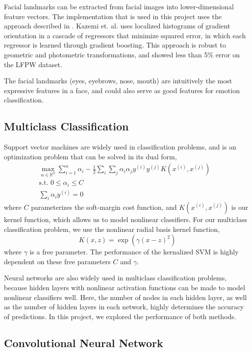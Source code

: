 \documentclass[10pt, twocolumn, twoside]{article}
\begin{document}
Facial landmarks can be extracted from facial images into lower-dimensional feature
vectors. The implementation that is used in this project uses the approach described
in \cite{Kazemi}. Kazemi et. al. uses localized histograms of gradient orientation in
a cascade of regressors that minimize squared error, in which each regressor is learned
through gradient boosting. This approach is robust to geometric and photometric
transformations, and showed less than 5\% error on the LFPW dataset.

The facial landmarks (eyes, eyebrows, nose, mouth) are intuitively the most expressive 
features in a face, and could also serve as good features for emotion classification.

\subsection{Multiclass Classification}

Support vector machines are widely used in classification problems, and is an
optimization problem that can be solved in its dual form,
\begin{align*}
\label{softsvm}
\max_{\alpha \in \mathbb{R}^n} \sum_{i=1}^n \alpha_i - \frac{1}{2}\sum_i\sum_j
\alpha_i\alpha_j y^{(i)}y^{(j)}K(x^{(i)}, x^{(j)}) & \\
\text{s.t. } 0 \le \alpha_i \le C & \\
\sum_i \alpha_i y^{(i)} = 0 &
\end{align*}
where $C$ parameterizes the soft-margin cost function, and $K(x^{(i)}, x^{(j)})$
is our kernel function, which allows us to model nonlinear classifiers.
For our multiclass classification problem, we use the nonlinear radial basis
kernel function,
\begin{equation*}
K(x, z) = \exp{(\gamma(x - z)^2)}
\end{equation*}
where $\gamma$ is a free parameter. The performance of the kernalized SVM is
highly dependent on these free parameters $C$ and $\gamma$.

Neural networks are also widely used in multiclass classification problems,
because hidden layers with nonlinear activation functions can be made to model
nonlinear classifiers well. Here, the number of nodes in each hidden layer, as
well as the number of hidden layers in each network, highly determines the accuracy
of predictions. In this project, we explored the performance of both methods.

\subsection{Convolutional Neural Network}
\end{document}
